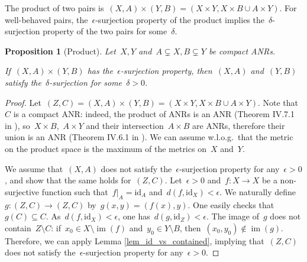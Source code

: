 \documentclass[english,11pt]{article}
\theoremstyle{plain}
\newtheorem{proposition}{Proposition}[section]
\theoremstyle{remark}
\theoremstyle{definition}
\newcommand{\id}{\mathrm{id}}
\newcommand{\im}{\mathop{\mathrm{im}}}
\newcommand{\C}[1]{\mathsf{C}(#1)}%
\begin{document}
The product of two pairs is~$(X,A)\times (Y,B)=(X\times Y,X\times B\cup A\times Y)$. For well-behaved pairs, the~$\epsilon$-surjection property of the product implies the~$\delta$-surjection property of the two pairs for some~$\delta$. 

\begin{proposition}[Product]\label{prop_product}
Let~$X,Y$ and~$A\subsetneq X,B\subsetneq Y$ be compact ANRs.

If~$(X,A)\times (Y,B)$ has the~$\epsilon$-surjection property, then~$(X,A)$ and~$(Y,B)$ satisfy the~$\delta$-surjection for some~$\delta>0$.
\end{proposition}
\begin{proof}
Let~$(Z,C)=(X,A)\times (Y,B)=(X\times Y,X\times B\cup A\times Y)$. Note that~$C$ is a compact ANR: indeed, the product of ANRs is an ANR (Theorem IV.7.1 in \cite{Borsuk67}), so~$X\times B$,~$A\times Y$ and their intersection~$A\times B$ are ANRs, therefore their union is an ANR (Theorem IV.6.1 in \cite{Borsuk67}). We can assume w.l.o.g.~that the metric on the product space is the maximum of the metrics on~$X$ and~$Y$.

We assume that~$(X,A)$ does not satisfy the~$\epsilon$-surjection property for any~$\epsilon>0$, and show that the same holds for~$(Z,C)$. Let~$\epsilon>0$ and~$f:X\to X$ be a non-surjective function such that~$f|_A=\id_A$ and~$d(f,\id_X)<\epsilon$. We naturally define~$g:(Z,C)\to (Z,C)$ by~$g(x,y)=(f(x),y)$. One easily checks that~$g(C)\subseteq C$. As~$d(f,\id_X)<\epsilon$, one has~$d(g,\id_Z)<\epsilon$. The image of~$g$ does not contain~$Z\setminus C$: if~$x_0\in X\setminus \im(f)$ and~$y_0\in Y\setminus B$, then~$(x_0,y_0)\notin\im(g)$. Therefore, we can apply Lemma \ref{lem_id_vs_contained}, implying that~$(Z,C)$ does not satisfy the~$\epsilon$-surjection property for any~$\epsilon>0$.
%
%
\end{proof}
\end{document}
